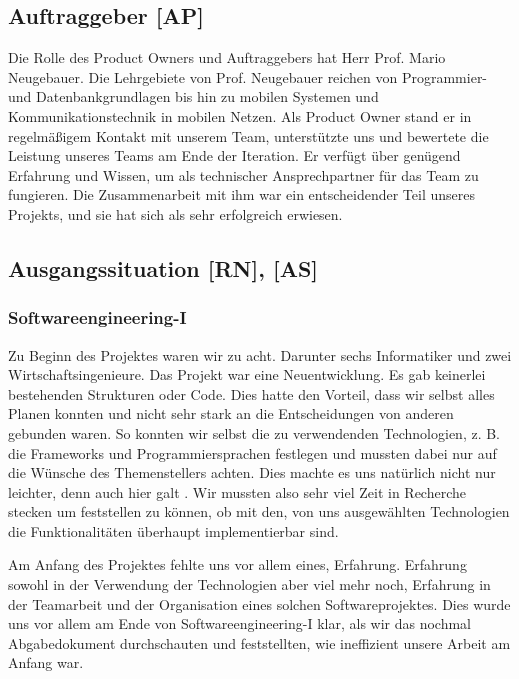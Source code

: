 \documentclass[10pt]{article}
\begin{document}
\subsection{Auftraggeber [AP]}
    Die Rolle des Product Owners und Auftraggebers hat Herr Prof. Mario Neugebauer. Die Lehrgebiete von Prof. Neugebauer
    reichen von Programmier- und Datenbankgrundlagen bis hin zu mobilen Systemen und Kommunikationstechnik in 
    mobilen Netzen. Als Product Owner stand er in regelmäßigem Kontakt mit unserem Team, unterstützte uns und
    bewertete die Leistung unseres Teams am Ende der Iteration. Er verfügt über genügend Erfahrung und Wissen,
    um als technischer Ansprechpartner für das Team zu fungieren. Die Zusammenarbeit mit ihm war ein entscheidender Teil 
    unseres Projekts, und sie hat sich als sehr erfolgreich erwiesen.

\subsection{Ausgangssituation [RN], [AS]}
\subsubsection{Softwareengineering-I}
Zu Beginn des Projektes waren wir zu acht. Darunter sechs Informatiker und zwei Wirtschaftsingenieure.
Das Projekt war eine Neuentwicklung. Es gab keinerlei bestehenden Strukturen oder Code. Dies hatte den Vorteil, dass wir
selbst alles Planen konnten und nicht sehr stark an die Entscheidungen von anderen gebunden waren. So konnten wir
selbst die zu verwendenden Technologien, z. B. die Frameworks und Programmiersprachen festlegen und mussten dabei
nur auf die Wünsche des Themenstellers achten. Dies machte es uns natürlich nicht nur leichter, denn auch
hier galt . Wir mussten also sehr viel Zeit in Recherche stecken um
feststellen zu können, ob mit den, von uns ausgewählten Technologien die Funktionalitäten überhaupt implementierbar sind.\par
\medskip
Am Anfang des Projektes fehlte uns vor allem eines, Erfahrung. Erfahrung sowohl in der Verwendung der Technologien
aber viel mehr noch, Erfahrung in der Teamarbeit und der Organisation eines solchen Softwareprojektes.
Dies wurde uns vor allem am Ende von Softwareengineering-I klar, als wir das nochmal Abgabedokument durchschauten
und feststellten, wie ineffizient unsere Arbeit am Anfang war.
\end{document}
